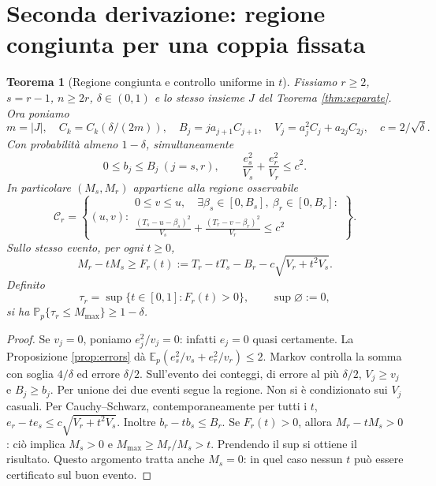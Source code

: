 \documentclass[11pt,a4paper]{article}
\newtheorem{theorem}[proposition]{Teorema}
\theoremstyle{remark}\newtheorem{remark}[proposition]{Osservazione}
\newcommand{\E}{\mathbb E_p}
\newcommand{\Pp}{\mathbb P_p}
\newcommand{\Mmax}{M_{\max}}
\begin{document}
\section{Seconda derivazione: regione congiunta per una coppia fissata}
\begin{theorem}[Regione congiunta e controllo uniforme in $t$]\label{thm:pair}
Fissiamo $r\ge2$, $s=r-1$, $n\ge2r$, $\delta\in(0,1)$ e lo stesso
insieme $J$ del Teorema \ref{thm:separate}. Ora poniamo
\[
 m=|J|,\quad C_k=C_k(\delta/(2m)),\quad
 B_j=j a_{j+1}C_{j+1},\quad V_j=a_j^2C_j+a_{2j}C_{2j},
 \quad c=2/\sqrt\delta.
\]
Con probabilità almeno $1-\delta$, simultaneamente
\[
 0\le b_j\le B_j\ (j=s,r),\qquad
 \frac{e_s^2}{V_s}+\frac{e_r^2}{V_r}\le c^2.
\]
In particolare $(M_s,M_r)$ appartiene alla regione osservabile
\[
 \mathcal C_r=\left\{(u,v):\begin{gathered}
 0\le v\le u,\quad \exists\beta_s\in[0,B_s],\ \beta_r\in[0,B_r]:\\
 \frac{(T_s-u-\beta_s)^2}{V_s}+
 \frac{(T_r-v-\beta_r)^2}{V_r}\le c^2
 \end{gathered}\right\}.
\]
Sullo stesso evento, per ogni $t\ge0$,
\[
 M_r-tM_s\ge F_r(t):=T_r-tT_s-B_r-c\sqrt{V_r+t^2V_s}.
\]
Definito
\[
 \tau_r=\sup\{t\in[0,1]:F_r(t)>0\},\qquad \sup\varnothing:=0,
\]
si ha $\Pp\{\tau_r\le\Mmax\}\ge1-\delta$.
\end{theorem}
\begin{proof}
Se $v_j=0$, poniamo $e_j^2/v_j=0$: infatti $e_j=0$ quasi certamente.
La Proposizione \ref{prop:errors} dà
$\E(e_s^2/v_s+e_r^2/v_r)\le2$. Markov controlla la somma con soglia
$4/\delta$ ed errore $\delta/2$. Sull'evento dei conteggi, di errore
al più $\delta/2$, $V_j\ge v_j$ e $B_j\ge b_j$. Per unione dei due
eventi segue la regione. Non si è condizionato sui $V_j$ casuali.
Per Cauchy--Schwarz, contemporaneamente per tutti i $t$,
$e_r-te_s\le c\sqrt{V_r+t^2V_s}$. Inoltre $b_r-tb_s\le B_r$.
Se $F_r(t)>0$, allora $M_r-tM_s>0$: ciò implica $M_s>0$ e
$\Mmax\ge M_r/M_s>t$. Prendendo il sup si ottiene il risultato.
Questo argomento tratta anche $M_s=0$: in quel caso nessun $t$ può
essere certificato sul buon evento.
\end{proof}
\end{document}
